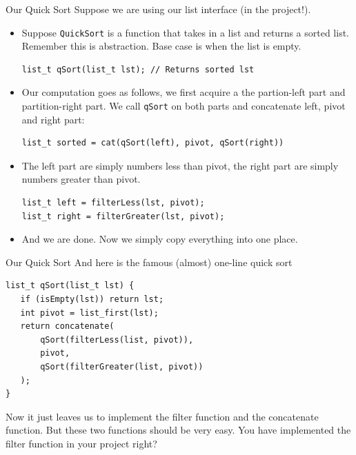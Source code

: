 \begin{frame}[fragile]{Our Quick Sort}
Suppose we are using our list interface (in the project!). 
\begin{itemize}
	\item Suppose \texttt{QuickSort} is a function that takes in a list and returns a sorted list. Remember this is abstraction. Base case is when the list is empty.
\begin{verbatim}
list_t qSort(list_t lst); // Returns sorted lst 
\end{verbatim}

	\item Our computation goes as follows, we first acquire a the partion-left part and partition-right part. We call \texttt{qSort} on both parts and concatenate left, pivot and right part:
\begin{verbatim}
list_t sorted = cat(qSort(left), pivot, qSort(right)) 
\end{verbatim}
	\item The left part are simply numbers less than pivot, the right part are simply numbers greater than pivot.
\begin{verbatim}
list_t left = filterLess(lst, pivot);
list_t right = filterGreater(lst, pivot);
\end{verbatim}
	\item And we are done. Now we simply copy everything into one place.
\end{itemize}
\end{frame}

\begin{frame}[fragile]{Our Quick Sort}
And here is the famous (almost) one-line quick sort
\begin{verbatim}
list_t qSort(list_t lst) {
   if (isEmpty(lst)) return lst;
   int pivot = list_first(lst);
   return concatenate(
       qSort(filterLess(list, pivot)),
       pivot,
       qSort(filterGreater(list, pivot))
   );
}
\end{verbatim}
Now it just leaves us to implement the filter function and the concatenate function. But these two functions should be very easy. You have implemented the filter function in your project right? 
\end{frame}

